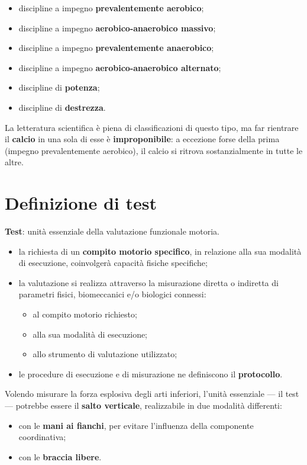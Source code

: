 \begin{itemize}
  \item discipline a impegno \textbf{prevalentemente aerobico};
  \item discipline a impegno \textbf{aerobico-anaerobico massivo};
  \item discipline a impegno \textbf{prevalentemente anaerobico};
  \item discipline a impegno \textbf{aerobico-anaerobico alternato};
  \item discipline di \textbf{potenza};
  \item discipline di \textbf{destrezza}.
\end{itemize}

La letteratura scientifica è piena di classificazioni di questo tipo, ma far rientrare il
\textbf{calcio} in una sola di esse è \textbf{improponibile}: a eccezione forse della prima
(impegno prevalentemente aerobico), il calcio si ritrova sostanzialmente in tutte le altre.

\section{Definizione di test}

\textbf{Test}: unità essenziale della valutazione funzionale motoria.

\begin{itemize}
  \item la richiesta di un \textbf{compito motorio specifico}, in relazione alla sua modalità di
    esecuzione, coinvolgerà capacità fisiche specifiche;
  \item la valutazione si realizza attraverso la misurazione diretta o indiretta di parametri
    fisici, biomeccanici e/o biologici connessi:
    \begin{itemize}
      \item al compito motorio richiesto;
      \item alla sua modalità di esecuzione;
      \item allo strumento di valutazione utilizzato;
    \end{itemize}
  \item le procedure di esecuzione e di misurazione ne definiscono il \textbf{protocollo}.
\end{itemize}

Volendo misurare la forza esplosiva degli arti inferiori, l'unità essenziale --- il test ---
potrebbe essere il \textbf{salto verticale}, realizzabile in due modalità differenti:
\begin{itemize}
  \item con le \textbf{mani ai fianchi}, per evitare l'influenza della componente coordinativa;
  \item con le \textbf{braccia libere}.
\end{itemize}

